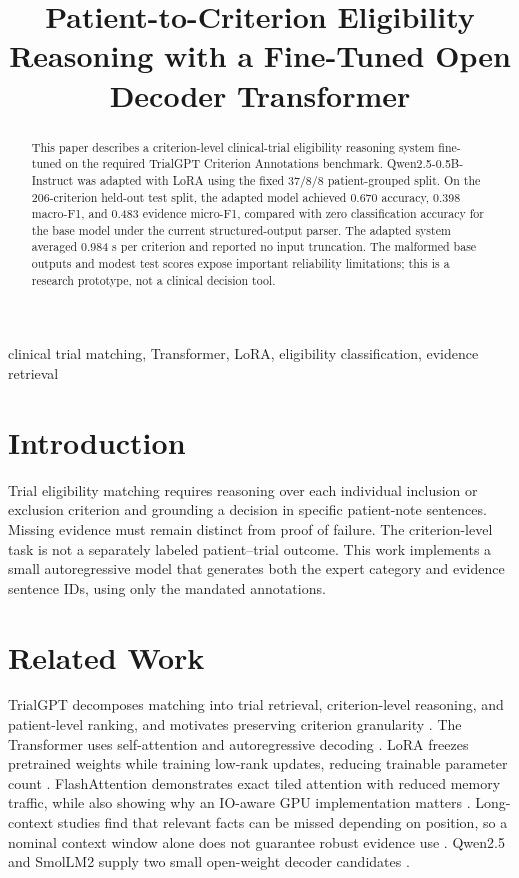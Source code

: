 \documentclass[conference]{IEEEtran}
\title{Patient-to-Criterion Eligibility Reasoning with a Fine-Tuned Open Decoder Transformer}
\author{\IEEEauthorblockN{Student Name}\IEEEauthorblockA{Department / University\\Email}}
\begin{document}
\maketitle
\begin{abstract}
This paper describes a criterion-level clinical-trial eligibility reasoning system fine-tuned on the required TrialGPT Criterion Annotations benchmark. Qwen2.5-0.5B-Instruct was adapted with LoRA using the fixed 37/8/8 patient-grouped split. On the 206-criterion held-out test split, the adapted model achieved 0.670 accuracy, 0.398 macro-F1, and 0.483 evidence micro-F1, compared with zero classification accuracy for the base model under the current structured-output parser. The adapted system averaged 0.984 s per criterion and reported no input truncation. The malformed base outputs and modest test scores expose important reliability limitations; this is a research prototype, not a clinical decision tool.
\end{abstract}
\begin{IEEEkeywords}clinical trial matching, Transformer, LoRA, eligibility classification, evidence retrieval\end{IEEEkeywords}
\section{Introduction}
Trial eligibility matching requires reasoning over each individual inclusion or exclusion criterion and grounding a decision in specific patient-note sentences. Missing evidence must remain distinct from proof of failure. The criterion-level task is not a separately labeled patient--trial outcome. This work implements a small autoregressive model that generates both the expert category and evidence sentence IDs, using only the mandated annotations.
\section{Related Work}
TrialGPT decomposes matching into trial retrieval, criterion-level reasoning, and patient-level ranking, and motivates preserving criterion granularity \cite{jiang2023trialgpt}. The Transformer uses self-attention and autoregressive decoding \cite{vaswani2017attention}. LoRA freezes pretrained weights while training low-rank updates, reducing trainable parameter count \cite{hu2021lora}. FlashAttention demonstrates exact tiled attention with reduced memory traffic, while also showing why an IO-aware GPU implementation matters \cite{dao2022flashattention}. Long-context studies find that relevant facts can be missed depending on position, so a nominal context window alone does not guarantee robust evidence use \cite{liu2023lost}. Qwen2.5 and SmolLM2 supply two small open-weight decoder candidates \cite{qwen2024,allal2025smollm}.
\end{document}
